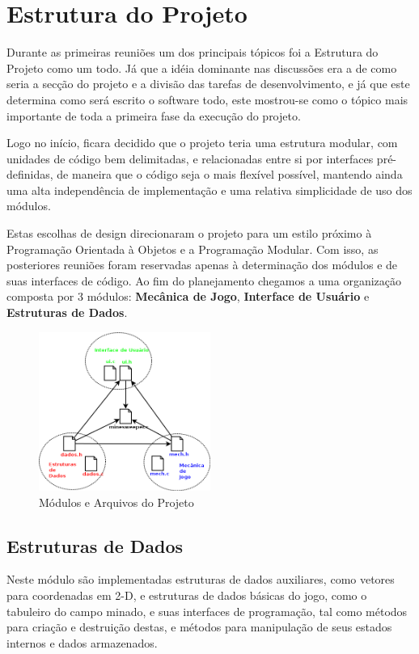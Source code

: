 \documentclass[10pt,a4paper]{report}
\begin{document}
\section{Estrutura do Projeto}
Durante as primeiras reuniões um dos principais tópicos foi a Estrutura do Projeto como um todo. Já que a idéia dominante nas discussões era a de como seria a secção do projeto e a divisão das tarefas de desenvolvimento, e já que este determina como será escrito o software todo, este mostrou-se como o tópico mais importante de toda a primeira fase da execução do projeto.

Logo no início, ficara decidido que o projeto teria uma estrutura modular, com unidades de código bem delimitadas, e relacionadas entre si por interfaces pré-definidas, de maneira que o código seja o mais flexível possível, mantendo ainda uma alta independência de implementação e uma relativa simplicidade de uso dos módulos.

Estas escolhas de design direcionaram o projeto para um estilo próximo à Programação Orientada à Objetos e a Programação Modular. Com isso, as posteriores reuniões foram reservadas apenas à determinação dos módulos e de suas interfaces de código. Ao fim do planejamento chegamos a uma organização composta por 3 módulos: \textbf{Mecânica de Jogo}, \textbf{Interface de Usuário} e \textbf{Estruturas de Dados}.

\begin{figure}[h]
\centering
\includegraphics[width=0.5\textwidth]{diagrama.png}
\caption{Módulos e Arquivos do Projeto}
\end{figure}

\subsection{Estruturas de Dados}
Neste módulo são implementadas estruturas de dados auxiliares, como vetores para coordenadas em 2-D, e estruturas de dados básicas do jogo, como o tabuleiro do campo minado, e suas interfaces de programação, tal como métodos para criação e destruição destas, e métodos para manipulação de seus estados internos e dados armazenados.
\end{document}
